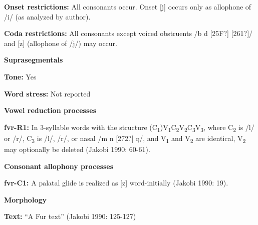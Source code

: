 \begin{styleBody}
\textbf{Onset restrictions: }All consonants occur. Onset [j] occurs only as allophone of /i/ (as analyzed by author).
\end{styleBody}

\begin{styleBody}
\textbf{Coda restrictions: }All consonants except voiced obstruents /b d [25F?] [261?]/ and [z] (allophone of /j/) may occur.
\end{styleBody}

\begin{styleBody}
\textbf{Suprasegmentals}
\end{styleBody}

\begin{styleBody}
\textbf{Tone:} Yes
\end{styleBody}

\begin{styleBody}
\textbf{Word stress:} Not reported
\end{styleBody}

\begin{styleBody}
\textbf{Vowel reduction processes}
\end{styleBody}

\begin{styleBody}
\textbf{fvr-R1:} In 3-syllable words with the structure (C\textsubscript{1})V\textsubscript{1}C\textsubscript{2}V\textsubscript{2}C\textsubscript{3}V\textsubscript{3}, where C\textsubscript{2} is /l/ or /r/, C\textsubscript{3} is /l/, /r/, or nasal /m n [272?] ŋ/, and V\textsubscript{1} and V\textsubscript{2} are identical, V\textsubscript{2} may optionally be deleted (Jakobi 1990: 60-61).
\end{styleBody}

\begin{styleBody}
\textbf{Consonant allophony processes}
\end{styleBody}

\begin{styleBody}
\textbf{fvr-C1: }A palatal glide is realized as [z] word-initially (Jakobi 1990: 19).
\end{styleBody}

\begin{styleBody}
\textbf{Morphology}
\end{styleBody}

\begin{styleBody}
\textbf{Text: }“A Fur text” (Jakobi 1990: 125-127)
\end{styleBody}

